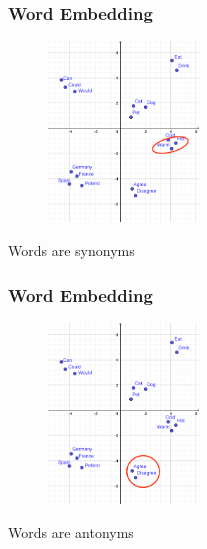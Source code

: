 \begin{frame}
	\frametitle{Word Embedding}

	\begin{figure}
		\includegraphics[width=4cm]{./figures/Group_synonym}

	\end{figure}
		\begin{center}
		{Words are synonyms}
		\end{center}
	\vspace{-0.5cm}

\end{frame}

\begin{frame}
	\frametitle{Word Embedding}

	\begin{figure}
		\includegraphics[width=4cm]{./figures/Group_antonyms}

	\end{figure}
		\begin{center}
		{Words are antonyms}
		\end{center}
	\vspace{-0.5cm}

\end{frame}

